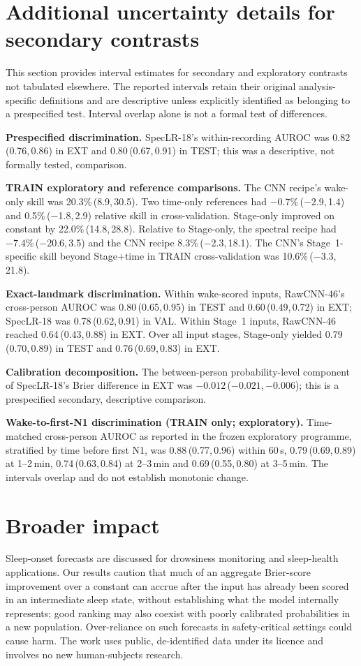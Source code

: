 \documentclass{article}
\newcommand{\ci}[2]{\,(#1,\,#2)}
\begin{document}
\FloatBarrier
\section{Additional uncertainty details for secondary contrasts}
\label{app:secondary_intervals}
This section provides interval estimates for secondary and exploratory contrasts not tabulated elsewhere. The reported intervals retain their original analysis-specific definitions and are descriptive unless explicitly identified as belonging to a prespecified test. Interval overlap alone is not a formal test of differences.

\textbf{Prespecified discrimination.} SpecLR-18's within-recording AUROC was 0.82\ci{0.76}{0.86} in EXT and 0.80\ci{0.67}{0.91} in TEST; this was a descriptive, not formally tested, comparison.

\textbf{TRAIN exploratory and reference comparisons.} The CNN recipe's wake-only skill was 20.3\%\ci{8.9}{30.5}. Two time-only references had $-0.7$\%\ci{$-$2.9}{1.4} and 0.5\%\ci{$-$1.8}{2.9} relative skill in cross-validation. Stage-only improved on constant by 22.0\%\ci{14.8}{28.8}. Relative to Stage-only, the spectral recipe had $-7.4$\%\ci{$-$20.6}{3.5} and the CNN recipe 8.3\%\ci{$-$2.3}{18.1}. The CNN's Stage~1-specific skill beyond Stage+time in TRAIN cross-validation was 10.6\%\ci{$-$3.3}{21.8}.

\textbf{Exact-landmark discrimination.} Within wake-scored inputs, RawCNN-46's cross-person AUROC was 0.80\ci{0.65}{0.95} in TEST and 0.60\ci{0.49}{0.72} in EXT; SpecLR-18 was 0.78\ci{0.62}{0.91} in VAL. Within Stage~1 inputs, RawCNN-46 reached 0.64\ci{0.43}{0.88} in EXT. Over all input stages, Stage-only yielded 0.79\ci{0.70}{0.89} in TEST and 0.76\ci{0.69}{0.83} in EXT.

\textbf{Calibration decomposition.} The between-person probability-level component of SpecLR-18's Brier difference in EXT was $-0.012$\ci{$-0.021$}{$-0.006$}; this is a prespecified secondary, descriptive comparison.

\textbf{Wake-to-first-N1 discrimination (TRAIN only; exploratory).} Time-matched cross-person AUROC as reported in the frozen exploratory programme, stratified by time before first N1, was 0.88\ci{0.77}{0.96} within 60\,s, 0.79\ci{0.69}{0.89} at 1--2\,min, 0.74\ci{0.63}{0.84} at 2--3\,min and 0.69\ci{0.55}{0.80} at 3--5\,min. The intervals overlap and do not establish monotonic change.

\section{Broader impact}
\label{app:impact}
Sleep-onset forecasts are discussed for drowsiness monitoring and sleep-health applications. Our results caution that much of an aggregate Brier-score improvement over a constant can accrue after the input has already been scored in an intermediate sleep state, without establishing what the model internally represents; good ranking may also coexist with poorly calibrated probabilities in a new population. Over-reliance on such forecasts in safety-critical settings could cause harm. The work uses public, de-identified data under its licence and involves no new human-subjects research.
\end{document}
